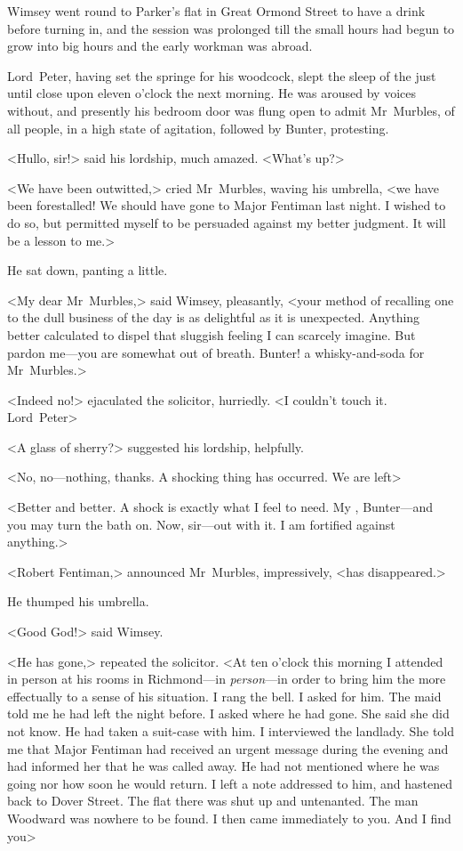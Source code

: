 Wimsey went round to Parker's flat in Great Ormond Street to have a drink before turning in, and the session was prolonged till the small hours had begun to grow into big hours and the early workman was abroad.

Lord~Peter, having set the springe for his woodcock, slept the sleep of the just until close upon eleven o'clock the next morning. He was aroused by voices without, and presently his bedroom door was flung open to admit Mr~Murbles, of all people, in a high state of agitation, followed by Bunter, protesting.

<Hullo, sir!> said his lordship, much amazed. <What's up?>

<We have been outwitted,> cried Mr~Murbles, waving his umbrella, <we have been forestalled! We should have gone to Major Fentiman last night. I wished to do so, but permitted myself to be persuaded against my better judgment. It will be a lesson to me.>

He sat down, panting a little.

<My dear Mr~Murbles,> said Wimsey, pleasantly, <your method of recalling one to the dull business of the day is as delightful as it is unexpected. Anything better calculated to dispel that sluggish feeling I can scarcely imagine. But pardon me—you are somewhat out of breath. Bunter! a whisky-and-soda for Mr~Murbles.>

<Indeed no!> ejaculated the solicitor, hurriedly. <I couldn't touch it. Lord~Peter\longdash>

<A glass of sherry?> suggested his lordship, helpfully.

<No, no—nothing, thanks. A shocking thing has occurred. We are left\longdash>

<Better and better. A shock is exactly what I feel to need. My , Bunter—and you may turn the bath on. Now, sir—out with it. I am fortified against anything.>

<Robert Fentiman,> announced Mr~Murbles, impressively, <has disappeared.>

He thumped his umbrella.

<Good God!> said Wimsey.

<He has gone,> repeated the solicitor. <At ten o'clock this morning I attended in person at his rooms in Richmond—in \emph{person}—in order to bring him the more effectually to a sense of his situation. I rang the bell. I asked for him. The maid told me he had left the night before. I asked where he had gone. She said she did not know. He had taken a suit-case with him. I interviewed the landlady. She told me that Major Fentiman had received an urgent message during the evening and had informed her that he was called away. He had not mentioned where he was going nor how soon he would return. I left a note addressed to him, and hastened back to Dover Street. The flat there was shut up and untenanted. The man Woodward was nowhere to be found. I then came immediately to you. And I find you\longdash>

